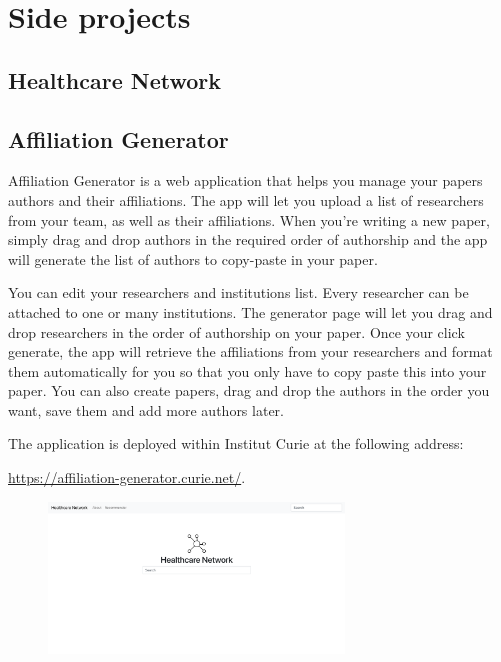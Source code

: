 \chapter{Side projects}

\section{Healthcare Network}

\section{Affiliation Generator}

Affiliation Generator is a web application that helps you manage your papers authors and their affiliations. The app will let you upload a list of researchers from your team, as well as their affiliations. When you're writing a new paper, simply drag and drop authors in the required order of authorship and the app will generate the list of authors to copy-paste in your paper.

You can edit your researchers and institutions list. Every researcher can be attached to one or many institutions. The generator page will let you drag and drop researchers in the order of authorship on your paper. Once your click generate, the app will retrieve the affiliations from your researchers and format them automatically for you so that you only have to copy paste this into your paper. You can also create papers, drag and drop the authors in the order you want, save them and add more authors later.

The application is deployed within Institut Curie at the following address:

\url{https://affiliation-generator.curie.net/}.

\begin{figure}[h]
    \includegraphics[width=0.7\textwidth]{images/healthcare-network/home.png}
    \centering
    \caption{}
    \label{fig:hn-home}
\end{figure}



